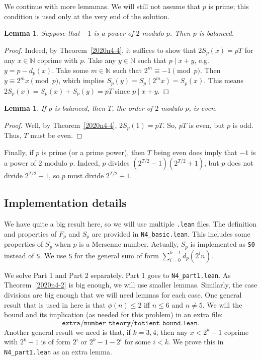 \documentclass{article}
\newtheorem{lemma}[theorem]{Lemma}
\newcommand{\N}{\mathbb{N}}
\begin{document}
We continue with more lemmmas.
We will still not assume that $p$ is prime; this condition is used only at the very end of the solution.

\begin{lemma}\label{2020n4-5}
Suppose that $-1$ is a power of $2$ modulo $p$.
Then $p$ is balanced.
\end{lemma}
\begin{proof}
Indeed, by Theorem~\ref{2020n4-4}, it suffices to show that $2 S_p(x) = pT$ for any $x \in \N$ coprime with $p$.
Take any $y \in \N$ such that $p \mid x + y$, e.g. $y = p - d_p(x)$.
Take some $m \in \N$ such that $2^m \equiv -1 \pmod{p}$.
Then $y \equiv 2^m x \pmod{p}$, which implies $S_p(y) = S_p(2^m x) = S_p(x)$.
This means $2 S_p(x) = S_p(x) + S_p(y) = pT$ since $p \mid x + y$.
\end{proof}

\begin{lemma}\label{2020n4-6}
If $p$ is balanced, then $T$, the order of $2$ modulo $p$, is even.
\end{lemma}
\begin{proof}
Well, by Theorem~\ref{2020n4-4}, $2 S_p(1) = pT$.
So, $pT$ is even, but $p$ is odd.
Thus, $T$ must be even.
\end{proof}

Finally, if $p$ is prime (or a prime power), then $T$ being even does imply that $-1$ is a power of $2$ modulo $p$.
Indeed, $p$ divides $(2^{T/2} - 1)(2^{T/2} + 1)$, but $p$ does not divide $2^{T/2} - 1$, so $p$ must divide $2^{T/2} + 1$.



\subsection*{Implementation details}

We have quite a big result here, so we will use multiple \texttt{.lean} files.
The definition and properties of $F_p$ and $S_p$ are provided in \texttt{N4\_basic.lean}.
This includes some properties of $S_p$ when $p$ is a Mersenne number.
Actually, $S_p$ is implemented as \texttt{S0} instead of \texttt{S}.
We use \texttt{S} for the general sum of form $\displaystyle \sum_{i = 0}^{k - 1} d_p(2^i n)$.

We solve Part 1 and Part 2 separately.
Part 1 goes to \texttt{N4\_part1.lean}.
As Theorem~\ref{2020n4-2} is big enough, we will use smaller lemmas.
Similarly, the case divisions are big enough that we will need lemmas for each case.
One general result that is used in here is that $\phi(n) \leq 2$ iff $n \leq 6$ and $n \neq 5$.
We will the bound and its implication (as needed for this problem) in an extra file:
\[ \texttt{extra/number\_theory/totient\_bound.lean}. \]
Another general result we need is that, if $k = 3, 4$, then any $x < 2^k - 1$ coprime with $2^k - 1$ is of form $2^i$ or $2^k - 1 - 2^i$ for some $i < k$.
We prove this in \texttt{N4\_part1.lean} as an extra lemma.
\end{document}
